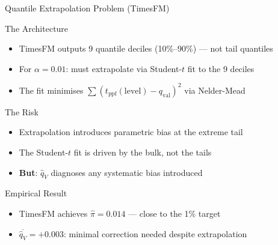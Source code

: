 \documentclass[9pt, aspectratio=169, t]{beamer}
\newcommand{\qV}{\hat{q}_V}
\begin{document}
\begin{frame}{Quantile Extrapolation Problem (TimesFM)}
	\vspace{-0.3cm}
	{\footnotesize
	\begin{block}{The Architecture}
		\begin{itemize}\setlength{\itemsep}{1pt}
			\item TimesFM outputs 9 quantile deciles (10\%--90\%) --- not tail quantiles
			\item For $\alpha = 0.01$: must extrapolate via Student-$t$ fit to the 9 deciles
			\item The fit minimises $\sum(t_{\mathrm{ppf}}(\text{level}) - q_{\mathrm{val}})^2$ via Nelder-Mead
		\end{itemize}
	\end{block}
	\begin{alertblock}{The Risk}
		\begin{itemize}\setlength{\itemsep}{1pt}
			\item Extrapolation introduces parametric bias at the extreme tail
			\item The Student-$t$ fit is driven by the bulk, not the tails
			\item \textbf{But}: $\qV$ diagnoses any systematic bias introduced
		\end{itemize}
	\end{alertblock}
	\begin{block}{Empirical Result}
		\begin{itemize}\setlength{\itemsep}{1pt}
			\item TimesFM achieves $\hat\pi = 0.014$ --- close to the 1\% target
			\item $\overline{\qV} = +0.003$: minimal correction needed despite extrapolation
		\end{itemize}
	\end{block}
	}
\end{frame}
\end{document}
